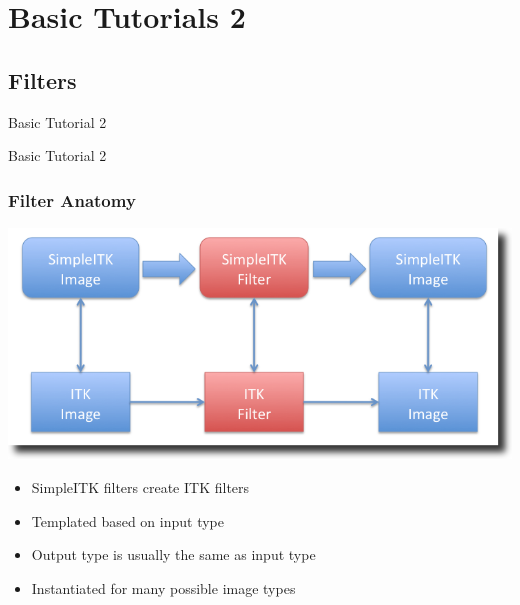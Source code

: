 \section{Basic Tutorials 2}

\subsection{Filters}

\begin{frame}{Basic Tutorial 2}
\fontsize{36pt}{36pt}\selectfont
\center
\begin{center}
Basic Tutorial 2
\end{center}
\end{frame}

\begin{frame}[fragile]
\frametitle{Filter Anatomy}
\begin{center}
  \includegraphics[width=.8\textwidth]{Images/FilterOverview_shadow}
\end{center}
\begin{itemize}
  \item SimpleITK filters create ITK filters
  \item Templated based on input type
  \item Output type is usually the same as input type
  \item Instantiated for many possible image types
\end{itemize}
\end{frame}

